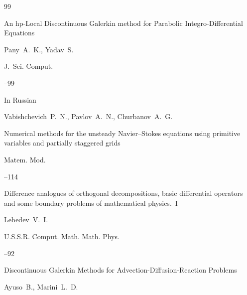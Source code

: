 \begin{thebibliography}{99}


\paper An hp-Local Discontinuous Galerkin method for Parabolic Integro-Differential Equations

\by Pany~A.~K., Yadav~S.


\jour J.~Sci. Comput.



--99








\lang In Russian

\by Vabishchevich~P.~N., Pavlov~A.~N., Churbanov~A.~G.

\paper Numerical methods for the unsteady Navier--Stokes equations using primitive variables and partially staggered grids

\jour Matem. Mod.




--114






\paper Difference analogues of orthogonal decompositions, basic differential operators and some boundary problems of mathematical physics.~I

\by Lebedev~V.~I.

\jour U.S.S.R. Comput. Math. Math. Phys.




--92











\paper Discontinuous Galerkin Methods for Advection-Diffusion-Reaction Problems 

\by Ayuso~B., Marini~L.~D.


\end{thebibliography}

